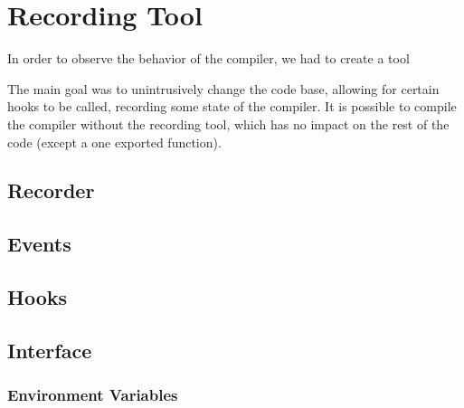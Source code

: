 \chapter{Recording Tool}

\begin{chapterabstract}
  \todoadd
\end{chapterabstract}

In order to observe the behavior of the compiler, we had to create a tool

The main goal was to unintrusively change the code base, allowing for certain hooks to be called, recording some state of the compiler. It is possible to compile the compiler without the recording tool, which has no impact on the rest of the code (except a one exported function).

\section{Recorder}

\section{Events}

\section{Hooks}

\section{Interface}

\subsection{Environment Variables}

